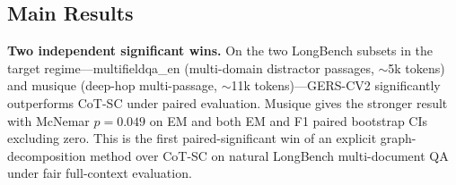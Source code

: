 \documentclass[11pt,a4paper]{article}
\begin{document}
\subsection{Main Results}


\begin{table}[h]
\centering
\caption{Main results on LongBench English multi-document QA (fair full-context evaluation, Qwen3-8B). All comparisons are paired (aligned sample IDs). \textbf{Bold} indicates GERS-CV2 wins; 95\% CIs from paired bootstrap (B=10{,}000) exclude zero for both mid-length regimes. narrativeqa is shown as a documented boundary (both methods hit a joint model-capacity ceiling at ${>}$22k tokens).}
\label{tab:main}
\end{table}

\textbf{Two independent significant wins.} On the two LongBench subsets in the target regime---multifieldqa\_en (multi-domain distractor passages, ${\sim}$5k tokens) and musique (deep-hop multi-passage, ${\sim}$11k tokens)---GERS-CV2 significantly outperforms CoT-SC under paired evaluation. Musique gives the stronger result with McNemar $p=0.049$ on EM and both EM and F1 paired bootstrap CIs excluding zero. This is the first paired-significant win of an explicit graph-decomposition method over CoT-SC on natural LongBench multi-document QA under fair full-context evaluation.
\end{document}
